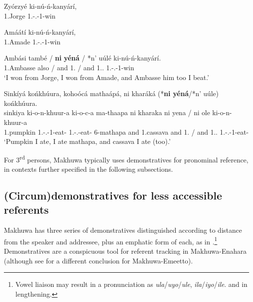 \documentclass[output=paper]{langscibook}
\begin{document}
\ex
\gll
Zyórzyé  ki-nú-ń-kanyárí,\\
1.Jorge  1\SG{}.\SM{}-\PFV{}.\PERS{}-1\OM{}-win\\
\glt

\gll
  Amáátí  ki-nú-ń-kanyárí,\\
1.Amade  1\SG{}.\SM{}-\PFV{}.\PERS{}-1\OM{}-win\\
\glt


\gll
  Ambási  també  / \textbf{ni}  \textbf{yéná}  / *n’  uúlé  ki-nú-\'{n}-kanyárí.\\
1.Ambasse  also /  and  1.\PRO{} /  and  1.\DEM{}.\DIST{}  1\SG{}.\SM{}-\PFV{}.\PERS{}-1\OM{}-win\\
\glt
‘I won from Jorge, I won from Amade, and Ambasse him too I beat.’

\ex
\label{bkm:Ref109900273}
Sinkíyá końkhúura, kohoócá mathaápá, ni kharáká (*\textbf{ni yéná}/*n’ uúle) końkhúura.\\
\gll
sinkiya  ki-o-n-khuur-a  ki-o-c-a  ma-thaapa  ni  kharaka  ni  yena /  ni  ole  ki-o-n-khuur-a \\
1.pumpkin  1\SG{}.\SM{}-\PFV{}.\DJ{}-1\OM{}-eat-\FV{}  1\SG{}.\SM{}-\PFV{}.\DJ{}-eat-\FV{}  6-mathapa and  1.cassava  and  1.\PRO{} /  and  1.\DEM{}.\DIST{}  1\SG{}.\SM{}-\PFV{}.\DJ{}-1\OM{}-eat-\FV{} \\
\glt
‘Pumpkin I ate, I ate mathapa, and cassava I ate (too).’\\
\z


For 3\textsuperscript{rd} persons, Makhuwa typically uses demonstratives for pronominal reference, in contexts further specified in the following subsections.


\subsection{(Circum)demonstratives for less accessible referents}
\label{bkm:Ref95380848}\label{bkm:Ref96973948}
Makhuwa has three series of demonstratives distinguished according to distance from the speaker and addressee, plus an emphatic form of each, as in .\footnote{Vowel liaison may result in a pronunciation as \textit{ula}/\textit{uyo}/\textit{ule}, \textit{ila}/\textit{iyo}/\textit{ile}. and in lengthening.} Demonstratives are a conspicuous tool for referent tracking in Makhuwa\hyp Enahara (although see \citealt{Poeta2016} for a different conclusion for Makhuwa-Emeetto). 
\end{document}
